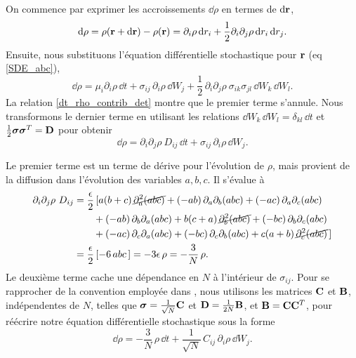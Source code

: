 \documentclass[openany,a4paper,12pt]{article}
\begin{document}
\par On commence par exprimer les accroissements $\dd \rho$ en termes de $\dd \bold r$,
%
\begin{equation}\label{averaging_drho_1}
	\dd\rho = \rho(\bold r+ \dd \bold r) - \rho (\bold r) = \partial_i\rho \, \dd r_i + \frac 12 \partial_i \partial_j \rho \, \dd r_i \, \dd r_j.
\end{equation}
% 
Ensuite, nous substituons l'équation différentielle stochastique pour $\bold r$ (eq \ref{SDE_abc}),
%
\begin{equation}\label{averaging_drho_2}
	\dd \rho = \mu_i\partial_i\rho \, \dd t + \sigma_{ij} \, \partial_i\rho \, \dd W_j + \frac 12 \, \partial_i \partial_j \rho \  \sigma_{ik}\sigma_{jl} \, \dd W_k \, \dd W_l.
\end{equation}
%
La relation \ref{dt_rho_contrib_det} montre que le premier terme s'annule. Nous transformons le dernier terme en utilisant les relations $\dd W_k \, \dd W_l = \delta_{kl} \, \dd t$ et $\frac 12 \boldsymbol \sigma \boldsymbol \sigma^T = \bold D$ pour obtenir
%
\begin{equation}\label{averaging_drho_3}
	\dd \rho = \partial_i \partial_j \rho \ D_{ij} \, \dd t + \sigma_{ij} \, \partial_i\rho \, \dd W_j.
\end{equation}
%
\par Le premier terme est un terme de dérive pour l'évolution de $\rho$, mais provient de la diffusion dans l'évolution des variables $a,b,c$. Il s'évalue à
%
\begin{equation}\label{drho_derive_stoch}
\begin{split}
	\partial_i \partial_j \rho \ D_{ij}
	&= \frac \epsilon 2 \, [ a(b+c) \, \cancel{ \partial_a^2(abc)} + (-ab) \, \partial_a \partial_b(abc) + (-ac) \, \partial_a\partial_c(abc) \\
	&\qquad + (-ab) \, \partial_b \partial_a (abc) + b(c+a) \, \cancel{ \partial_b^2(abc)} + (-bc) \, \partial_b\partial_c(abc) \\
	&\qquad + (-ac) \, \partial_c\partial_a(abc) + (-bc) \, \partial_c\partial_b(abc) + c(a+b) \, \cancel{ \partial_c^2(abc)} \,] \\
	&= \frac \epsilon 2 \, [-6 \, abc \,] = -3\epsilon \, \rho = -\frac 3N \, \rho.
\end{split}
\end{equation}
%
Le deuxième terme cache une dépendance en $N$ à l'intérieur de $\sigma_{ij}$. Pour se rapprocher de la convention employée dans \cite{frey2012}, nous utilisons les matrices $\bold C$ et $\bold B$, indépendentes de $N$, telles que $\boldsymbol \sigma = \frac{1}{\sqrt{N}} \bold C$ et $\bold D = \frac{1}{2N} \bold B$, et $\bold B = \bold C \bold C^T$, pour réécrire notre équation différentielle stochastique sous la forme
%
\begin{equation}\label{averaging_drho_4}
	\dd \rho = -\frac 3N \, \rho \, \dd t + \frac{1}{\sqrt{N}}\, C_{ij} \, \partial_i\rho \, \dd W_j.
\end{equation}
%
\end{document}
